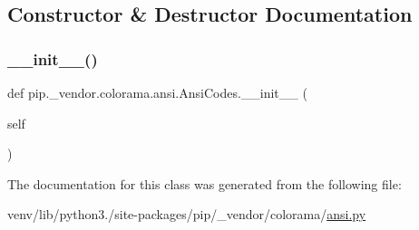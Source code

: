 \subsection{Constructor \& Destructor Documentation}
\mbox{\label{classpip_1_1__vendor_1_1colorama_1_1ansi_1_1AnsiCodes_a320fa4a146d8be484cb1c5e6c19ffffa}} 
\subsubsection{\texorpdfstring{\+\_\+\+\_\+init\+\_\+\+\_\+()}{\_\_init\_\_()}}
{\footnotesize\ttfamily def pip.\+\_\+vendor.\+colorama.\+ansi.\+Ansi\+Codes.\+\_\+\+\_\+init\+\_\+\+\_\+ (\begin{DoxyParamCaption}\item[{}]{self }\end{DoxyParamCaption})}



The documentation for this class was generated from the following file\+:\begin{DoxyCompactItemize}
\item 
venv/lib/python3./site-\/packages/pip/\+\_\+vendor/colorama/\hyperlink{ansi_8py}{ansi.\+py}\end{DoxyCompactItemize}
